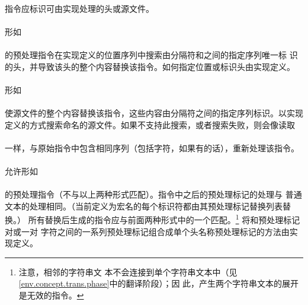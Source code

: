 {

\constraint
\paragraph{}
指令应标识可由实现处理的头或源文件。

\semantic
\paragraph{}
形如                                                                          \\
\mbox{\hspace{4em}\tm{>} }  \\
的预处理指令在实现定义的位置序列中搜索由分隔符\tm{<}和\tm{>}之间的指定序列唯一标
识的头，并导致该头的整个内容替换该指令。如何指定位置或标识头由实现定义。

\paragraph{}
形如                                                                          \\
\mbox{\hspace{4em}\tm{\dq}
  }                                                              \\
使源文件的整个内容替换该指令，这些内容由分隔符\tm{\dq}之间的指定序列标识。以实现
定义的方式搜索命名的源文件。如果不支持此搜索，或者搜索失败，则会像读取        \\
\mbox{\hspace{4em}\tm{>} }  \\
一样，与原始指令中包含相同序列（包括\tm{>}字符，如果有的话），重新处理该指令。

\paragraph{}
允许形如                                                                      \\
\mbox{\hspace{4em} }                    \\
的预处理指令（不与以上两种形式匹配）。指令中之后的预处理标记的处理与
普通文本的处理相同。（当前定义为宏名的每个标识符都由其预处理标记替换列表替换。）
所有替换后生成的指令应与前面两种形式中的一个匹配。\footnote{注意，相邻的字符串文
本不会连接到单个字符串文本中（见\ref{env.concept.trans.phase}中的翻译阶段）；因
此，产生两个字符串文本的展开是无效的指令。} 将\tm{<}和\tm{>}预处理标记对或一对
\tm{\dq}字符之间的一系列预处理标记组合成单个头名称预处理标记的方法由实现定义。

}
